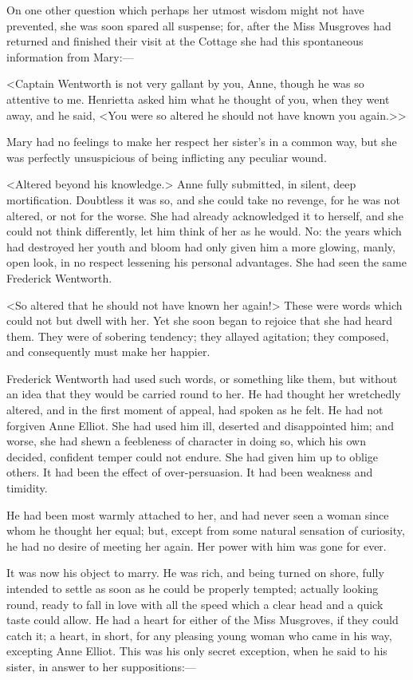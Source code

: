 On one other question which perhaps her utmost wisdom might not have prevented, she was soon spared all suspense; for, after the Miss Musgroves had returned and finished their visit at the Cottage she had this spontaneous information from Mary:—

<Captain Wentworth is not very gallant by you, Anne, though he was so attentive to me. Henrietta asked him what he thought of you, when they went away, and he said, <You were so altered he should not have known you again.>>

Mary had no feelings to make her respect her sister's in a common way, but she was perfectly unsuspicious of being inflicting any peculiar wound.

<Altered beyond his knowledge.> Anne fully submitted, in silent, deep mortification. Doubtless it was so, and she could take no revenge, for he was not altered, or not for the worse. She had already acknowledged it to herself, and she could not think differently, let him think of her as he would. No: the years which had destroyed her youth and bloom had only given him a more glowing, manly, open look, in no respect lessening his personal advantages. She had seen the same Frederick Wentworth.

<So altered that he should not have known her again!> These were words which could not but dwell with her. Yet she soon began to rejoice that she had heard them. They were of sobering tendency; they allayed agitation; they composed, and consequently must make her happier.

Frederick Wentworth had used such words, or something like them, but without an idea that they would be carried round to her. He had thought her wretchedly altered, and in the first moment of appeal, had spoken as he felt. He had not forgiven Anne Elliot. She had used him ill, deserted and disappointed him; and worse, she had shewn a feebleness of character in doing so, which his own decided, confident temper could not endure. She had given him up to oblige others. It had been the effect of over-persuasion. It had been weakness and timidity.

He had been most warmly attached to her, and had never seen a woman since whom he thought her equal; but, except from some natural sensation of curiosity, he had no desire of meeting her again. Her power with him was gone for ever.

It was now his object to marry. He was rich, and being turned on shore, fully intended to settle as soon as he could be properly tempted; actually looking round, ready to fall in love with all the speed which a clear head and a quick taste could allow. He had a heart for either of the Miss Musgroves, if they could catch it; a heart, in short, for any pleasing young woman who came in his way, excepting Anne Elliot. This was his only secret exception, when he said to his sister, in answer to her suppositions:—

